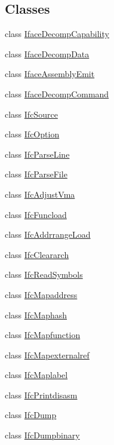 \subsection*{Classes}
\begin{DoxyCompactItemize}
\item 
class \mbox{\hyperlink{class_iface_decomp_capability}{Iface\+Decomp\+Capability}}
\item 
class \mbox{\hyperlink{class_iface_decomp_data}{Iface\+Decomp\+Data}}
\item 
class \mbox{\hyperlink{class_iface_assembly_emit}{Iface\+Assembly\+Emit}}
\item 
class \mbox{\hyperlink{class_iface_decomp_command}{Iface\+Decomp\+Command}}
\item 
class \mbox{\hyperlink{class_ifc_source}{Ifc\+Source}}
\item 
class \mbox{\hyperlink{class_ifc_option}{Ifc\+Option}}
\item 
class \mbox{\hyperlink{class_ifc_parse_line}{Ifc\+Parse\+Line}}
\item 
class \mbox{\hyperlink{class_ifc_parse_file}{Ifc\+Parse\+File}}
\item 
class \mbox{\hyperlink{class_ifc_adjust_vma}{Ifc\+Adjust\+Vma}}
\item 
class \mbox{\hyperlink{class_ifc_funcload}{Ifc\+Funcload}}
\item 
class \mbox{\hyperlink{class_ifc_addrrange_load}{Ifc\+Addrrange\+Load}}
\item 
class \mbox{\hyperlink{class_ifc_cleararch}{Ifc\+Cleararch}}
\item 
class \mbox{\hyperlink{class_ifc_read_symbols}{Ifc\+Read\+Symbols}}
\item 
class \mbox{\hyperlink{class_ifc_mapaddress}{Ifc\+Mapaddress}}
\item 
class \mbox{\hyperlink{class_ifc_maphash}{Ifc\+Maphash}}
\item 
class \mbox{\hyperlink{class_ifc_mapfunction}{Ifc\+Mapfunction}}
\item 
class \mbox{\hyperlink{class_ifc_mapexternalref}{Ifc\+Mapexternalref}}
\item 
class \mbox{\hyperlink{class_ifc_maplabel}{Ifc\+Maplabel}}
\item 
class \mbox{\hyperlink{class_ifc_printdisasm}{Ifc\+Printdisasm}}
\item 
class \mbox{\hyperlink{class_ifc_dump}{Ifc\+Dump}}
\item 
class \mbox{\hyperlink{class_ifc_dumpbinary}{Ifc\+Dumpbinary}}
\item 

\end{DoxyCompactItemize}
